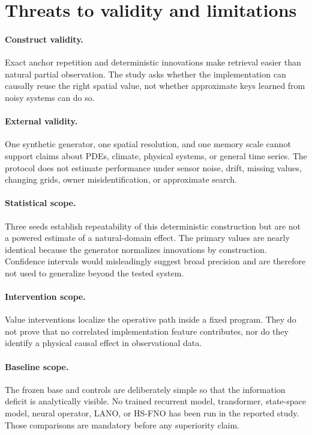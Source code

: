 \documentclass[11pt]{article}
\begin{document}
\section{Threats to validity and limitations}

\paragraph{Construct validity.}
Exact anchor repetition and deterministic innovations make retrieval easier
than natural partial observation. The study asks whether the implementation can
causally reuse the right spatial value, not whether approximate keys learned
from noisy systems can do so.

\paragraph{External validity.}
One synthetic generator, one spatial resolution, and one memory scale cannot
support claims about PDEs, climate, physical systems, or general time series.
The protocol does not estimate performance under sensor noise, drift, missing
values, changing grids, owner misidentification, or approximate search.

\paragraph{Statistical scope.}
Three seeds establish repeatability of this deterministic construction but are
not a powered estimate of a natural-domain effect. The primary values are
nearly identical because the generator normalizes innovations by construction.
Confidence intervals would misleadingly suggest broad precision and are
therefore not used to generalize beyond the tested system.

\paragraph{Intervention scope.}
Value interventions localize the operative path inside a fixed program. They do
not prove that no correlated implementation feature contributes, nor do they
identify a physical causal effect in observational data.

\paragraph{Baseline scope.}
The frozen base and controls are deliberately simple so that the information
deficit is analytically visible. No trained recurrent model, transformer,
state-space model, neural operator, LANO, or HS-FNO has been run in the reported
study. Those comparisons are mandatory before any superiority claim.
\end{document}
